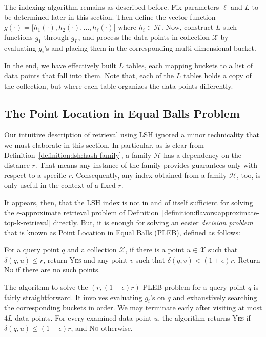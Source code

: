 The indexing algorithm remains as described before.
Fix parameters $\ell$ and $L$ to be determined later in
this section. Then define the vector function
$g(\cdot) = \big[ h_1(\cdot), h_2(\cdot), \ldots, h_\ell(\cdot) \big]$
where $h_i \in \mathcal{H}$. Now, construct $L$ such functions $g_1$ through $g_L$, and process
the data points in collection $\mathcal{X}$ by evaluating $g_i$'s and placing
them in the corresponding multi-dimensional bucket.

\begin{svgraybox}
In the end, we have effectively
built $L$ tables, each mapping buckets to a list of data points that
fall into them. Note that, each of the $L$ tables holds a copy of the collection,
but where each table organizes the data points differently.
\end{svgraybox}

\subsection{The Point Location in Equal Balls Problem}
Our intuitive description of retrieval using LSH ignored a minor technicality
that we must elaborate in this section. In particular, as is clear from 
Definition~\ref{definition:lsh:hash-family}, a family $\mathcal{H}$ has
a dependency on the distance $r$. That means any instance of the family provides guarantees
only with respect to a specific $r$. Consequently, any index obtained
from a family $\mathcal{H}$, too, is only useful in the context of a fixed $r$.

It appears, then, that the LSH index is not in and of itself sufficient
for solving the $\epsilon$-approximate retrieval problem of
Definition~\ref{definition:flavors:approximate-top-k-retrieval} directly.
But, it is enough for solving an easier \emph{decision problem} that is
known as Point Location in Equal Balls (PLEB), defined as follows:

\begin{definition}
    \label{definition:lsh:pleb}
    For a query point $q$ and a collection $\mathcal{X}$,
    if there is a point $u \in \mathcal{X}$ such that $\delta(q, u) \leq r$,
    return \textsc{Yes} and any point $v$ such that $\delta(q, v) < (1+\epsilon)r$.
    Return \textsc{No} if there are no such points.
\end{definition}

The algorithm to solve the $(r, (1+\epsilon)r)$-PLEB problem for a query point $q$
is fairly straightforward. It involves evaluating $g_i$'s on $q$ and exhaustively searching the
corresponding buckets in order. We may terminate early after visiting at
most $4L$ data points. For every examined data point $u$, the algorithm
returns \textsc{Yes} if $\delta(q, u) \leq (1+\epsilon)r$, and \textsc{No} otherwise.

